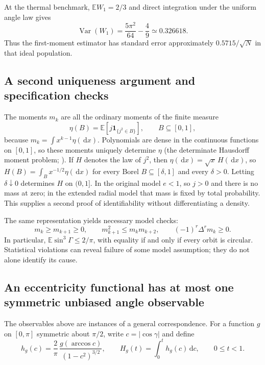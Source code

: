 \documentclass[11pt,a4paper]{article}
\theoremstyle{remark}\newtheorem{remark}[theorem]{Remark}
\DeclareMathOperator{\Var}{Var}
\newcommand{\E}{\mathbb E}
\newcommand{\ind}{\mathbf 1}
\newcommand{\dd}{\,\mathrm d}
\begin{document}
At the thermal benchmark, $\E W_1=2/3$ and direct integration under the uniform angle law gives
\begin{equation}
\Var(W_1)=\frac{5\pi^2}{64}-\frac49\simeq0.326618.
\end{equation}
Thus the first-moment estimator has standard error approximately $0.5715/\sqrt N$ in that ideal population.

\subsection{A second uniqueness argument and specification checks}

The moments $m_k$ are all the ordinary moments of the finite measure
\begin{equation}
\eta(B)=\E[j\ind_{\{j^2\in B\}}],\qquad B\subseteq[0,1],
\end{equation}
because $m_k=\int x^{k-1}\eta(\dd x)$. Polynomials are dense in the continuous functions on $[0,1]$, so these moments uniquely determine $\eta$ (the determinate Hausdorff moment problem; \citealp{Hausdorff1923}). If $H$ denotes the law of $j^2$, then $\eta(\dd x)=\sqrt x\,H(\dd x)$, so $H(B)=\int_Bx^{-1/2}\eta(\dd x)$ for every Borel $B\subseteq[\delta,1]$ and every $\delta>0$. Letting $\delta\downarrow0$ determines $H$ on $(0,1]$. In the original model $e<1$, so $j>0$ and there is no mass at zero; in the extended radial model that mass is fixed by total probability. This supplies a second proof of identifiability without differentiating a density.

The same representation yields necessary model checks:
\begin{equation}
m_k\ge m_{k+1}\ge0,\qquad
m_{k+1}^2\le m_km_{k+2},\qquad
(-1)^r\Delta^r m_k\ge0.
\end{equation}
In particular, $\E\sin^3\Gamma\le2/\pi$, with equality if and only if every orbit is circular. Statistical violations can reveal failure of some model assumption; they do not alone identify its cause.

\subsection{An eccentricity functional has at most one symmetric unbiased angle observable}

The observables above are instances of a general correspondence. For a function $g$ on $[0,\pi]$ symmetric about $\pi/2$, write $c=|\cos\gamma|$ and define
\begin{equation}\label{eq:Hg}
h_g(c)=\frac2\pi\,\frac{g(\arccos c)}{(1-c^2)^{3/2}},\qquad H_g(t)=\int_0^th_g(c)\dd c,\qquad 0\le t<1.
\end{equation}
\end{document}
